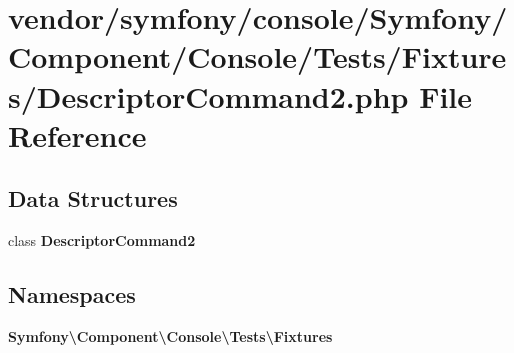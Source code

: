 \section{vendor/symfony/console/\+Symfony/\+Component/\+Console/\+Tests/\+Fixtures/\+Descriptor\+Command2.php File Reference}
\label{_descriptor_command2_8php}
\subsection*{Data Structures}
\begin{DoxyCompactItemize}
\item 
class {\bf Descriptor\+Command2}
\end{DoxyCompactItemize}
\subsection*{Namespaces}
\begin{DoxyCompactItemize}
\item 
 {\bf Symfony\textbackslash{}\+Component\textbackslash{}\+Console\textbackslash{}\+Tests\textbackslash{}\+Fixtures}
\end{DoxyCompactItemize}
